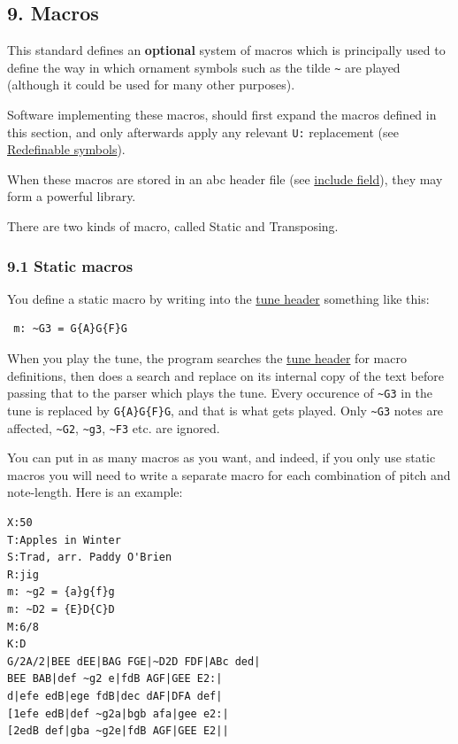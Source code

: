 \documentclass[oneside]{book}
\begin{document}
\hypertarget{macros}{\subsection{9. Macros}\label{macros}}

This standard defines an \textbf{optional} system of macros which is
principally used to define the way in which ornament symbols such as the
tilde \texttt{\textasciitilde{}} are played (although it could be used
for many other purposes).

Software implementing these macros, should first expand the macros
defined in this section, and only afterwards apply any relevant
\texttt{U:} replacement (see
\protect\hyperlink{redefinable_symbols}{Redefinable symbols}).

When these macros are stored in an abc header file (see
\protect\hyperlink{include_field}{include field}), they may form a
powerful library.

There are two kinds of macro, called Static and Transposing.

\hypertarget{static_macros}{\subsubsection{9.1 Static
macros}\label{static_macros}}

You define a static macro by writing into the
\protect\hyperlink{tune_header_definition}{tune header} something like
this:

\begin{verbatim}
 m: ~G3 = G{A}G{F}G
\end{verbatim}

When you play the tune, the program searches the
\protect\hyperlink{tune_header_definition}{tune header} for macro
definitions, then does a search and replace on its internal copy of the
text before passing that to the parser which plays the tune. Every
occurence of \texttt{\textasciitilde{}G3} in the tune is replaced by
\texttt{G\{A\}G\{F\}G}, and that is what gets played. Only
\texttt{\textasciitilde{}G3} notes are affected,
\texttt{\textasciitilde{}G2}, \texttt{\textasciitilde{}g3},
\texttt{\textasciitilde{}F3} etc. are ignored.

You can put in as many macros as you want, and indeed, if you only use
static macros you will need to write a separate macro for each
combination of pitch and note-length. Here is an example:

\begin{verbatim}
X:50
T:Apples in Winter
S:Trad, arr. Paddy O'Brien
R:jig
m: ~g2 = {a}g{f}g
m: ~D2 = {E}D{C}D
M:6/8
K:D
G/2A/2|BEE dEE|BAG FGE|~D2D FDF|ABc ded|
BEE BAB|def ~g2 e|fdB AGF|GEE E2:|
d|efe edB|ege fdB|dec dAF|DFA def|
[1efe edB|def ~g2a|bgb afa|gee e2:|
[2edB def|gba ~g2e|fdB AGF|GEE E2||
\end{verbatim}
\end{document}
